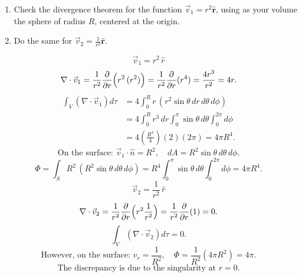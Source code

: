 

%
%

\newcommand{\hmwkTitle}{HW 02}
\newcommand{\hmwkSubTitle}{Assignment 2}
\newcommand{\hmwkDueDate}{February 13th, 2025}
\newcommand{\hmwkDueTime}{11:59 PM}
\newcommand{\hmwkClass}{PHYS 313}
\newcommand{\hmwkClassTime}{0101}
\newcommand{\hmwkClassInstructor}{Dr. Ji}
\newcommand{\hmwkAuthorName}{\textbf{Vai Srivastava}}
\newcommand{\hmwkCompletionDate}{\today}



\maketitle

\pagebreak

\begin{hwkProblem}{1.39}{}

	\begin{enumerate}
		\item Check the divergence theorem for the function \(  \vec{v}_1=r^2\mathbf{\hat{r}} \), using as your volume the sphere of radius \( R \), centered at the origin.
		\item Do the same for \( \vec{v}_2 = \frac{1}{r^2} \mathbf{\hat{r}} \).
	\end{enumerate}

	\hwkSol

	\hwkPart
	\[
		\vec{v}_1 = r^2 \, \hat{r}
	\]
	\[
		\nabla \cdot \vec{v}_1 = \frac{1}{r^2}\frac{\partial}{\partial r}\Bigl(r^2\,(r^2)\Bigr)
		=\frac{1}{r^2}\frac{\partial}{\partial r}(r^4)
		=\frac{4r^3}{r^2}=4r.
	\]
	\[
		\begin{aligned}
			\int_V (\nabla\cdot\vec{v}_1) d\tau &= 4\int_0^R r\, (r^2\sin\theta\,dr\,d\theta\,d\phi)\\[1mm]
							    &= 4\int_0^R r^3\,dr \int_0^\pi \sin\theta\,d\theta \int_0^{2\pi}d\phi\\[1mm]
							    &= 4\left(\frac{R^4}{4}\right)(2)(2\pi)=4\pi R^4.
		\end{aligned}
	\]
	\[
		\text{On the surface: } \vec{v}_1\cdot\hat{n}=R^2,\quad dA=R^2\sin\theta\,d\theta\,d\phi.
	\]
	\[
		\Phi = \int_S R^2\,(R^2\sin\theta\,d\theta\,d\phi)
		=R^4\int_0^\pi\sin\theta\,d\theta\int_0^{2\pi}d\phi
		=4\pi R^4.
	\]
	\hwkPart
	\[
		\vec{v}_2 = \frac{1}{r^2}\,\hat{r}
	\]
	\[
		\nabla\cdot\vec{v}_2 = \frac{1}{r^2}\frac{\partial}{\partial r}\Bigl(r^2\frac{1}{r^2}\Bigr)
		=\frac{1}{r^2}\frac{\partial}{\partial r}(1)=0.
	\]
	\[
		\int_V (\nabla\cdot\vec{v}_2)d\tau=0.
	\]
	\[
		\text{However, on the surface: } v_r=\frac{1}{R^2},\quad \Phi = \frac{1}{R^2}(4\pi R^2)=4\pi.
	\]
	\[
		\text{The discrepancy is due to the singularity at } r=0.
	\]
\end{hwkProblem}

